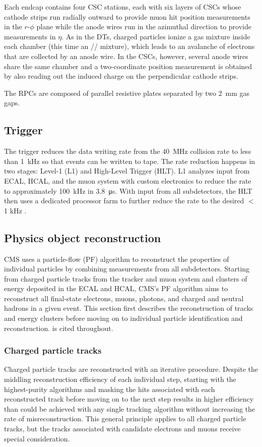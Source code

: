 Each endcap contains four CSC stations, each with six layers of CSCs whose cathode strips run radially outward to provide muon hit position measurements in the $r$-$\phi$ plane while the anode wires run in the azimuthal direction to provide measurements in $\eta$. As in the DTs, charged particles ionize a gas mixture inside each chamber (this time an // mixture), which leads to an avalanche of electrons that are collected by an anode wire. In the CSCs, however, several anode wires share the same chamber and a two-coordinate position measurement is obtained by also reading out the induced charge on the perpendicular cathode strips.

The RPCs are composed of parallel resistive plates separated by two \SI{2}{\mm} gas gaps.

\subsection{Trigger}
\label{trigger}
The trigger reduces the data writing rate from the \SI{40}{\MHz} collision rate to less than \SI{1}{\kHz} so that events can be written to tape. The rate reduction happens in two stages: Level-1 (L1) and High-Level Trigger (HLT). L1 analyzes input from ECAL, HCAL, and the muon system with custom electronics to reduce the rate to approximately \SI{100}{\kHz} in \SI{3.8}{\us}. With input from all subdetectors, the HLT then uses a dedicated processor farm to further reduce the rate to the desired $<$ 1 kHz \cite{cms_experiment, cms_trigger_upgrade}.

\subsection{Physics object reconstruction}
CMS uses a particle-flow (PF) algorithm to reconstruct the properties of individual particles by combining measurements from all subdetectors. Starting from charged particle tracks from the tracker and muon system and clusters of energy deposited in the ECAL and HCAL, CMS's PF algorithm aims to reconstruct all final-state electrons, muons, photons, and charged and neutral hadrons in a given event. This section first describes the reconstruction of tracks and energy clusters before moving on to individual particle identification and reconstruction. \cite{cms_pf} is cited throughout.

\subsubsection{Charged particle tracks}
Charged particle tracks are reconstructed with an iterative procedure. Despite the middling reconstruction efficiency of each individual step, starting with the highest-purity algorithms and masking the hits associated with each reconstructed track before moving on to the next step results in higher efficiency than could be achieved with any single tracking algorithm without increasing the rate of misreconstruction. This general principle applies to all charged particle tracks, but the tracks associated with candidate electrons and muons receive special consideration.

